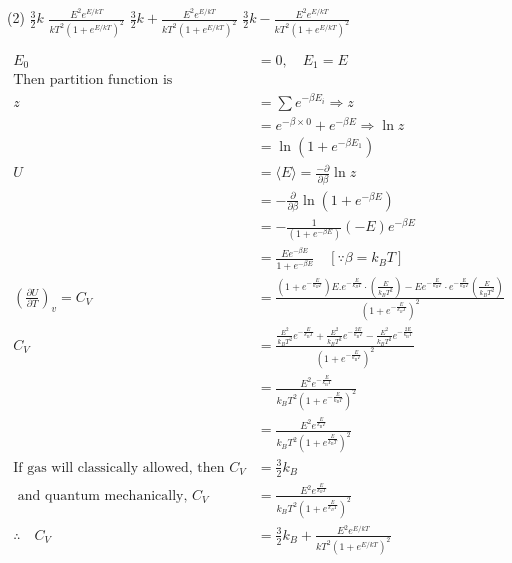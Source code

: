 \begin{enumerate}
{}
\begin{tasks}(2)
\task[\textbf{A.}] $\frac{3}{2} k$
\task[\textbf{B.}] $\frac{E^{2} e^{E / k T}}{k T^{2}\left(1+e^{E / k T}\right)^{2}}$
\task[\textbf{C.}] $\frac{3}{2} k+\frac{E^{2} e^{E / k T}}{k T^{2}\left(1+e^{E / k T}\right)^{2}}$
\task[\textbf{D.}] $\frac{3}{2} k-\frac{E^{2} e^{E / k T}}{k T^{2}\left(1+e^{E / k T}\right)^{2}}$
\end{tasks}
\begin{answer}
\begin{align*}
E_{0}&=0, \quad E_{1}=E\\
\text{Then partition function is}\\
z&=\sum e^{-\beta E_{i}} \Rightarrow z\\&=e^{-\beta \times 0}+e^{-\beta E} \Rightarrow \ln z\\&=\ln \left(1+e^{-\beta E_{1}}\right)\\
U&=\langle E\rangle=\frac{-\partial}{\partial \beta} \ln z\\&=-\frac{\partial}{\partial \beta} \ln \left(1+e^{-\beta E}\right)\\&=-\frac{1}{\left(1+e^{-\beta E}\right)}(-E) e^{-\beta E}\\&=\frac{E e^{-\beta E}}{1+e^{-\beta E}} \quad\left[\because \beta=k_{B} T\right]\\
\left(\frac{\partial U}{\partial T}\right)_{v}=C_{V}&=\frac{\left(1+e^{-\frac{E}{k_{B} T}}\right) E . e^{-\frac{E}{k_{B} T}} \cdot\left(\frac{E}{k_{B} T^{2}}\right)-E e^{-\frac{E}{k_{B} T}} \cdot e^{-\frac{E}{k_{B} T}}\left(\frac{E}{k_{B} T^{2}}\right)}{\left(1+e^{-\frac{E}{k_{B} T}}\right)^{2}}\\
C_{V}&=\frac{\frac{E^{2}}{k_{B} T^{2}} e^{-\frac{E}{k_{\mathrm{B}} T}}+\frac{E^{2}}{k_{B} T^{2}} e^{-\frac{2 E}{k_{\mathrm{B}} T}}-\frac{E^{2}}{k_{B} T^{2}} e^{-\frac{2 E}{k_{\mathrm{B}} T}}}{\left(1+e^{-\frac{E}{k_{\mathrm{B}} T}}\right)^{2}}\\&=\frac{E^{2} e^{-\frac{E}{k_{\mathrm{B}} T}}}{k_{B} T^{2}\left(1+e^{-\frac{E}{k_{\mathrm{B}} T}}\right)^{2}}\\&=\frac{E^{2} e^{\frac{E}{k_{\mathrm{B}} T}}}{k_{B} T^{2}\left(1+e^{\frac{E}{k_{\mathrm{B}} T}}\right)^{2}}\\
\text{If gas will classically allowed, then }C_{V}&=\frac{3}{2} k_{B}\\
\text{	and quantum mechanically, }C_{V}&=\frac{E^{2} e^{\frac{E}{k_{B} T}}}{k_{B} T^{2}\left(1+e^{\frac{E}{k_{B} T}}\right)^{2}}\\
\therefore \quad C_{V}&=\frac{3}{2} k_{B}+\frac{E^{2} e^{E / k T}}{k T^{2}\left(1+e^{E / k T}\right)^{2}}

\end{align*}
\end{answer}
\end{enumerate}

